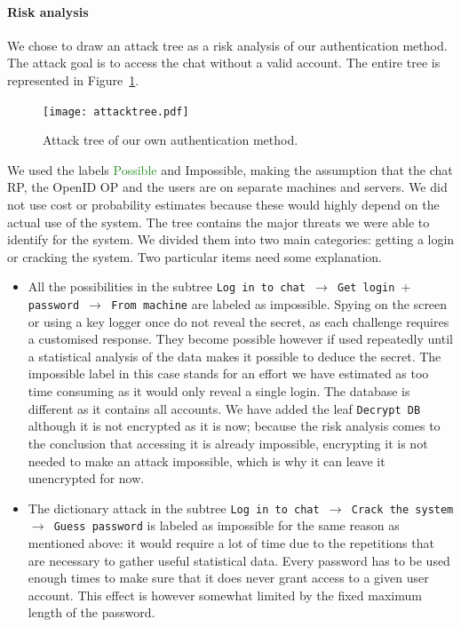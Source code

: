 \documentclass[11pt,a4paper]{article}
\begin{document}
\paragraph{Risk analysis} We chose to draw an attack tree as a risk analysis of our authentication method. The attack goal is to access the chat without a valid account. The entire tree is represented in Figure~\ref{fig:attacktree}.
\begin{figure}[!ht]
\centering
\texttt{[image: attacktree.pdf]}
\caption{Attack tree of our own authentication method.}
\label{fig:attacktree}
\end{figure}
We used the labels \textcolor{ForestGreen}{Possible} and \textcolor{BrickRed}{Impossible}, making the assumption that the chat RP, the OpenID OP and the users are on separate machines and servers. We did not use cost or probability estimates because these would highly depend on the actual use of the system.
The tree contains the major threats we were able to identify for the system. We divided them into two main categories: getting a login or cracking the system.
Two particular items need some explanation.
\begin{itemize}
\item All the possibilities in the subtree \texttt{Log in to chat $\rightarrow$ Get login $+$ password $\rightarrow$ From machine} are labeled as impossible. Spying on the screen or using a key logger once do not reveal the secret, as each challenge requires a customised response. They become possible however if used repeatedly until a statistical analysis of the data makes it possible to deduce the secret. The impossible label in this case stands for an effort we have estimated as too time consuming as it would only reveal a single login. The database is different as it contains all accounts. We have added the leaf \texttt{Decrypt DB} although it is not encrypted as it is now; because the risk analysis comes to the conclusion that accessing it is already impossible, encrypting it is not needed to make an attack impossible, which is why it can leave it unencrypted for now.
\item The dictionary attack in the subtree \texttt{Log in to chat $\rightarrow$ Crack the system $\rightarrow$ Guess password} is labeled as impossible for the same reason as mentioned above: it would require a lot of time due to the repetitions that are necessary to gather useful statistical data. Every password has to be used enough times to make sure that it does never grant access to a given user account. This effect is however somewhat limited by the fixed maximum length of the password.
\end{itemize}
\end{document}
